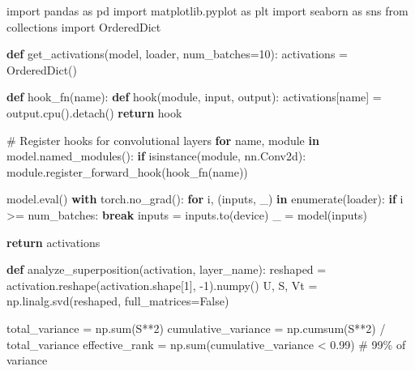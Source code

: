 \documentclass[
  letterpaper,
  DIV=11,
  numbers=noendperiod]{scrreprt}
\newenvironment{Shaded}{\begin{snugshade}}{\end{snugshade}}
\newcommand{\BuiltInTok}[1]{\textcolor[rgb]{0.00,0.23,0.31}{#1}}
\newcommand{\CommentTok}[1]{\textcolor[rgb]{0.37,0.37,0.37}{#1}}
\newcommand{\ControlFlowTok}[1]{\textcolor[rgb]{0.00,0.23,0.31}{\textbf{#1}}}
\newcommand{\DecValTok}[1]{\textcolor[rgb]{0.68,0.00,0.00}{#1}}
\newcommand{\FloatTok}[1]{\textcolor[rgb]{0.68,0.00,0.00}{#1}}
\newcommand{\ImportTok}[1]{\textcolor[rgb]{0.00,0.46,0.62}{#1}}
\newcommand{\KeywordTok}[1]{\textcolor[rgb]{0.00,0.23,0.31}{\textbf{#1}}}
\newcommand{\NormalTok}[1]{\textcolor[rgb]{0.00,0.23,0.31}{#1}}
\newcommand{\OperatorTok}[1]{\textcolor[rgb]{0.37,0.37,0.37}{#1}}
\newcommand{\VariableTok}[1]{\textcolor[rgb]{0.07,0.07,0.07}{#1}}
\begin{document}
\begin{Shaded}
\begin{Highlighting}[]
\ImportTok{import}\NormalTok{ pandas }\ImportTok{as}\NormalTok{ pd}
\ImportTok{import}\NormalTok{ matplotlib.pyplot }\ImportTok{as}\NormalTok{ plt}
\ImportTok{import}\NormalTok{ seaborn }\ImportTok{as}\NormalTok{ sns}
\ImportTok{from}\NormalTok{ collections }\ImportTok{import}\NormalTok{ OrderedDict}

\KeywordTok{def}\NormalTok{ get\_activations(model, loader, num\_batches}\OperatorTok{=}\DecValTok{10}\NormalTok{):}
\NormalTok{    activations }\OperatorTok{=}\NormalTok{ OrderedDict()}

    \KeywordTok{def}\NormalTok{ hook\_fn(name):}
        \KeywordTok{def}\NormalTok{ hook(module, }\BuiltInTok{input}\NormalTok{, output):}
\NormalTok{            activations[name] }\OperatorTok{=}\NormalTok{ output.cpu().detach()}
        \ControlFlowTok{return}\NormalTok{ hook}

    \CommentTok{\# Register hooks for convolutional layers}
    \ControlFlowTok{for}\NormalTok{ name, module }\KeywordTok{in}\NormalTok{ model.named\_modules():}
        \ControlFlowTok{if} \BuiltInTok{isinstance}\NormalTok{(module, nn.Conv2d):}
\NormalTok{            module.register\_forward\_hook(hook\_fn(name))}

\NormalTok{    model.}\BuiltInTok{eval}\NormalTok{()}
    \ControlFlowTok{with}\NormalTok{ torch.no\_grad():}
        \ControlFlowTok{for}\NormalTok{ i, (inputs, \_) }\KeywordTok{in} \BuiltInTok{enumerate}\NormalTok{(loader):}
            \ControlFlowTok{if}\NormalTok{ i }\OperatorTok{\textgreater{}=}\NormalTok{ num\_batches:}
                \ControlFlowTok{break}
\NormalTok{            inputs }\OperatorTok{=}\NormalTok{ inputs.to(device)}
\NormalTok{            \_ }\OperatorTok{=}\NormalTok{ model(inputs)}

    \ControlFlowTok{return}\NormalTok{ activations}

\KeywordTok{def}\NormalTok{ analyze\_superposition(activation, layer\_name):}
\NormalTok{    reshaped }\OperatorTok{=}\NormalTok{ activation.reshape(activation.shape[}\DecValTok{1}\NormalTok{], }\OperatorTok{{-}}\DecValTok{1}\NormalTok{).numpy()}
\NormalTok{    U, S, Vt }\OperatorTok{=}\NormalTok{ np.linalg.svd(reshaped, full\_matrices}\OperatorTok{=}\VariableTok{False}\NormalTok{)}

\NormalTok{    total\_variance }\OperatorTok{=}\NormalTok{ np.}\BuiltInTok{sum}\NormalTok{(S}\OperatorTok{**}\DecValTok{2}\NormalTok{)}
\NormalTok{    cumulative\_variance }\OperatorTok{=}\NormalTok{ np.cumsum(S}\OperatorTok{**}\DecValTok{2}\NormalTok{) }\OperatorTok{/}\NormalTok{ total\_variance}
\NormalTok{    effective\_rank }\OperatorTok{=}\NormalTok{ np.}\BuiltInTok{sum}\NormalTok{(cumulative\_variance }\OperatorTok{\textless{}} \FloatTok{0.99}\NormalTok{)  }\CommentTok{\# 99\% of variance}


\end{Highlighting}
\end{Shaded}
\end{document}
